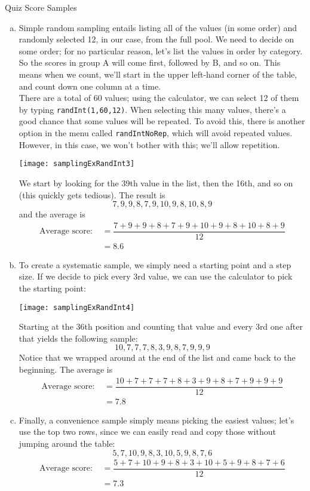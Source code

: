 \begin{example}{Quiz Score Samples}
\begin{enumerate}[(a)]
\item Simple random sampling entails listing all of the values (in some order) and randomly selected 12, in our case, from the full pool.  We need to decide on some order; for no particular reason, let's list the values in order by category.  So the scores in group A will come first, followed by B, and so on.  This means when we count, we'll start in the upper left-hand corner of the table, and count down one column at a time.\\

There are a total of 60 values; using the calculator, we can select 12 of them by typing \texttt{randInt(1,60,12)}.  When selecting this many values, there's a good chance that some values will be repeated.  To avoid this, there is another option in the menu called \texttt{randIntNoRep}, which will avoid repeated values.  However, in this case, we won't bother with this; we'll allow repetition.
\begin{center}
\texttt{[image: samplingExRandInt3]}
\end{center}
We start by looking for the 39th value in the list, then the 16th, and so on (this quickly gets tedious).  The result is
\[\boxed{7, 9, 9, 8, 7, 9, 10, 9, 8, 10, 8, 9}\]
and the average is
\begin{align*}
\textrm{Average score: } &= \dfrac{7+9+9+8+7+9+10+9+8+10+8+9}{12}\\
&= \boxed{8.6}
\end{align*}

\item To create a systematic sample, we simply need a starting point and a step size.  If we decide to pick every 3rd value, we can use the calculator to pick the starting point:
\begin{center}
\texttt{[image: samplingExRandInt4]}
\end{center}
Starting at the 36th position and counting that value and every 3rd one after that yields the following sample:
\[\boxed{10, 7, 7, 7, 8, 3, 9, 8, 7, 9, 9, 9}\]
Notice that we wrapped around at the end of the list and came back to the beginning.  The average is
\begin{align*}
\textrm{Average score: } &= \dfrac{10+7+7+7+8+3+9+8+7+9+9+9}{12}\\
&= \boxed{7.8}
\end{align*}

\item Finally, a convenience sample simply means picking the easiest values; let's use the top two rows, since we can easily read and copy those without jumping around the table:
\[\boxed{5, 7, 10, 9, 8, 3, 10, 5, 9, 8, 7, 6}\]
\begin{align*}
\textrm{Average score: } &= \dfrac{5+7+10+9+8+3+10+5+9+8+7+6}{12}\\
&= \boxed{7.3}
\end{align*}
\end{enumerate}
\end{example}

